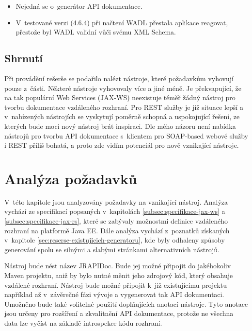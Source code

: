 \documentclass[11pt,twoside,a4paper]{book}
\begin{document}
\begin{itemize}
  \item Nejedná se o~generátor API dokumentace.
  \item V~testované verzi (4.6.4) při načtení WADL přestala aplikace  reagovat,
  přestože byl WADL validní vůči svému XML Schema.
\end{itemize}


\subsection{Shrnutí}

Při provádění rešerše se podařilo nalézt nástroje, které požadavkům vyhovují
pouze z~části.
Některé nástroje vyhovovaly více a jiné méně. Je překvapující, že na tak
populární Web Services (JAX-WS) neexistuje téměř žádný nástroj pro tvorbu
dokumentace vzdáleného rozhraní. Pro REST služby je již situace lepší a
v~nabízených nástrojích se vyskytují poměrně schopná a uspokojující řešení, ze
kterých bude moci nový nástroj brát inspiraci. Dle mého názoru není nabídka
nástrojů pro tvorbu API dokumentace s~klientem pro SOAP-based webové služby i
REST příliš bohatá, a proto zde vidím potenciál pro nově vznikající nástroje.

\section{Analýza požadavků}
\label{sec:analyza-pozadavku}

V~této kapitole jsou analyzovány požadavky na vznikající nástroj. Analýza vychází ze
specifikací popsaných v~kapitolách \ref{subsec:specifikace-jax-ws} a
\ref{subsec:specifikace-jax-rs}, které se zabývaly možnostmi definice vzdáleného rozhraní na platformě Java EE. Dále analýza vychází z~poznatků získaných
v~kapitole \ref{sec:reserse-existujicich-generatoru}, kde byly odhaleny způsoby
generování spolu se silnými a slabými stránkami alternativních nástrojů.

Nástroj bude nést název JRAPIDoc. Bude jej možné připojit do jakéhokoliv Maven
projektu, aniž by bylo nutné měnit jeho zdrojový kód, který obsahuje vzdálené
rozhraní. Nástroj bude možné připojit k~již existujícímu projektu například až
v~závěrečné fázi vývoje a vygenerovat tak API dokumentaci. Umožněno bude také
volitelné použití doplňujících anotací nástroje. Tyto anotace jsou určeny pro
rozšíření a zkvalitnění API dokumentace, protože ne všechna data lze vyčíst
na základě introspekce kódu rozhraní.
\end{document}
